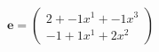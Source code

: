 \documentclass[preview]{standalone}
\begin{document}
\begin{align*}
\mathbf{e} = \begin{pmatrix}2 + -1x^{1} + -1x^{3} \\ -1 + 1x^{1} + 2x^{2}\end{pmatrix}
\end{align*}
\end{document}
